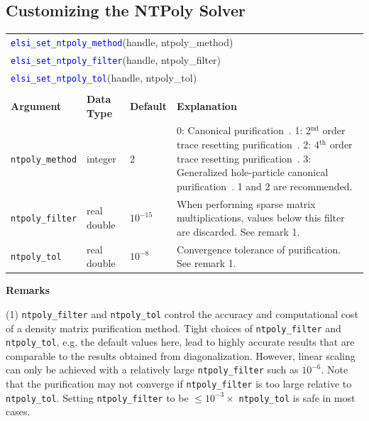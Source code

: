 \documentclass{report}
\newcommand{\api}[1]{\textcolor{blue}{\texttt{#1}}}
\begin{document}
\subsection{Customizing the NTPoly Solver}
\label{subsec:setter_ntpoly}
\begin{tabular}[]{|p{30mm}|p{20mm}|p{15mm}|p{97mm}|}
\multicolumn{4}{l}{\api{elsi\_set\_ntpoly\_method}(handle, ntpoly\_method)}\\
\multicolumn{4}{l}{\api{elsi\_set\_ntpoly\_filter}(handle, ntpoly\_filter)}\\
\multicolumn{4}{l}{\api{elsi\_set\_ntpoly\_tol}(handle, ntpoly\_tol)}\\
\multicolumn{4}{l}{}\\
\hline
\multicolumn{1}{|l|}{\textbf{Argument}} & \multicolumn{1}{l|}{\textbf{Data Type}} & \multicolumn{1}{l|}{\textbf{Default}} & \multicolumn{1}{l|}{\textbf{Explanation}}\\
\hline
\texttt{ntpoly\_method} & integer     & 2          & 0: Canonical purification~\cite{purification_palser_1998}. 1: 2$^\text{nd}$ order trace resetting purification~\cite{purification_niklasson_2002}. 2: 4$^\text{th}$ order trace resetting purification~\cite{purification_niklasson_2002}. 3: Generalized hole-particle canonical purification~\cite{purification_truflandier_2016}. 1 and 2 are recommended.\\
\hline
\texttt{ntpoly\_filter} & real double & $10^{-15}$ & When performing sparse matrix multiplications, values below this filter are discarded. See remark 1.\\
\hline
\texttt{ntpoly\_tol}    & real double & $10^{-8}$  & Convergence tolerance of purification. See remark 1.\\
\hline
\end{tabular}

\textbf{Remarks}

(1) \texttt{ntpoly\_filter} and \texttt{ntpoly\_tol} control the accuracy and computational cost of a density matrix purification method. Tight choices of \texttt{ntpoly\_filter} and \texttt{ntpoly\_tol}, e.g. the default values here, lead to highly accurate results that are comparable to the results obtained from diagonalization. However, linear scaling can only be achieved with a relatively large \texttt{ntpoly\_filter} such as $10^{-6}$. Note that the purification may not converge if \texttt{ntpoly\_filter} is too large relative to \texttt{ntpoly\_tol}. Setting \texttt{ntpoly\_filter} to be $\le 10^{-3} \times $ \texttt{ntpoly\_tol} is safe in most cases.
\end{document}
